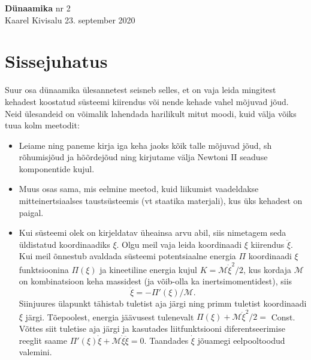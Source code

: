 \documentclass[a4paper,11pt,twocolumn]{article}
\begin{document}
{\huge \textbf{Dünaamika} \hfill \normalsize {nr 2}} \\
{Kaarel Kivisalu \hfill 23. september 2020}\\

\section*{Sissejuhatus}
Suur osa dünaamika ülesannetest seisneb selles, et on vaja leida mingitest kehadest koostatud süsteemi kiirendus või nende kehade vahel mõjuvad jõud. Neid ülesandeid on võimalik lahendada harilikult mitut moodi, kuid välja võiks tuua kolm meetodit:
\begin{itemize}
	\item Leiame ning paneme kirja iga keha jaoks kõik talle mõjuvad jõud, sh rõhumisjõud ja hõõrdejõud ning kirjutame välja Newtoni II seaduse komponentide kujul.
	\item Muus osas sama, mis eelmine meetod, kuid
	liikumist vaadeldakse mitteinertsiaalses taustsüsteemis
	(vt staatika materjali), kus üks kehadest on paigal.
	\item Kui süsteemi olek on kirjeldatav üheainsa arvu abil, siis nimetagem seda üldistatud koordinaadiks $ \xi $. Olgu meil vaja leida koordinaadi $ \xi $ kiirendus $ \ddot{\xi} $. Kui meil õnnestub avaldada süsteemi potentsiaalne energia $ \Pi $ koordinaadi $ \xi $ funktsioonina $ \Pi(\xi) $ ja kineetiline energia kujul $ K = \mathcal{M}\dot{\xi}^2/2 $, kus kordaja $ \mathcal{M} $ on kombinatsioon keha massidest (ja võib-olla ka inertsimomentidest), siis$$ \ddot{\xi}=−\Pi'(\xi)/\mathcal{M}.$$Siinjuures ülapunkt tähistab tuletist aja järgi ning primm tuletist koordinaadi $ \xi $ järgi. Tõepoolest, energia jäävusest tulenevalt $\Pi(\xi) + \mathcal{M}\dot{\xi}^2/2=$ Const. Võttes siit tuletise aja järgi 	ja kasutades liitfunktsiooni diferentseerimise reeglit saame $\Pi'(\xi)\dot{\xi} + \mathcal{M}\dot{\xi}\ddot{\xi}=0$. Taandades $ \dot{\xi} $ jõuamegi eelpooltoodud valemini.
\end{itemize}
\end{document}
